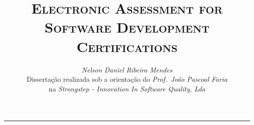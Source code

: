 \documentclass[9pt,a4paper]{extarticle}
\begin{document}
\title{\vspace*{-8mm}\textbf{\textsc{Electronic Assessment for Software Development Certifications}}}
\author{\emph{Nelson Daniel Ribeiro Mendes}\\[2mm]
\small{Dissertação realizada sob a orientação do \emph{Prof.\ João Pascoal Faria}}\\
\small{na \emph{Strongstep - Innovation In Software Quality, Lda}}}
\date{}
\maketitle
\thispagestyle{empty}

\vspace*{-4mm}\noindent\rule{\textwidth}{0.4pt}\vspace*{4mm}
\end{document}
